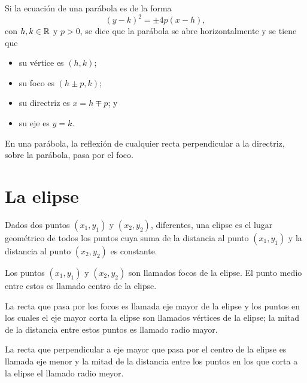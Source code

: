 \documentclass[a4,11pt]{aleph-notas}
\begin{document}
\begin{teo}
    Si la ecuación de una parábola es de la forma 
    \[
        (y-k)^2=\pm 4p(x-h),
    \]
    con $h,k\in\mathbb{R}$ y $p>0$, se dice que la parábola se abre horizontalmente y se tiene que
    \begin{multicols}{2}
    \begin{itemize}
        \item su vértice es $(h,k)$;
        \item su foco es $(h\pm p,k)$;
        \item su directriz es $x=h \mp p$; y
        \item su eje es $y=k$.
    \end{itemize}
    \end{multicols}
\end{teo}

\begin{advertencia}
    En una parábola, la reflexión de cualquier recta perpendicular a la directriz, sobre la parábola, pasa por el foco.
\end{advertencia}


\section{La elipse}

\begin{defi}[Elipse]
    Dados dos puntos $(x_1,y_1)$ y $(x_2,y_2)$, diferentes, una elipse es el lugar geométrico de todos los puntos cuya suma de la distancia al punto $(x_1,y_1)$ y la distancia al punto $(x_2,y_2)$ es constante. 
    
    Los puntos $(x_1,y_1)$ y $(x_2,y_2)$ son llamados focos de la elipse. El punto medio entre estos es llamado centro de la elipse.
    
    La recta que pasa por los focos es llamada eje mayor de la elipse y los puntos en los cuales el eje mayor corta la elipse son llamados vértices de la elipse; la mitad de la distancia entre estos puntos es llamado radio mayor.
    
    La recta que perpendicular a eje mayor que pasa por el centro de la elipse es llamada eje menor y la mitad de la distancia entre los puntos en los que corta a la elipse el llamado radio meyor.
\end{defi}
\end{document}
